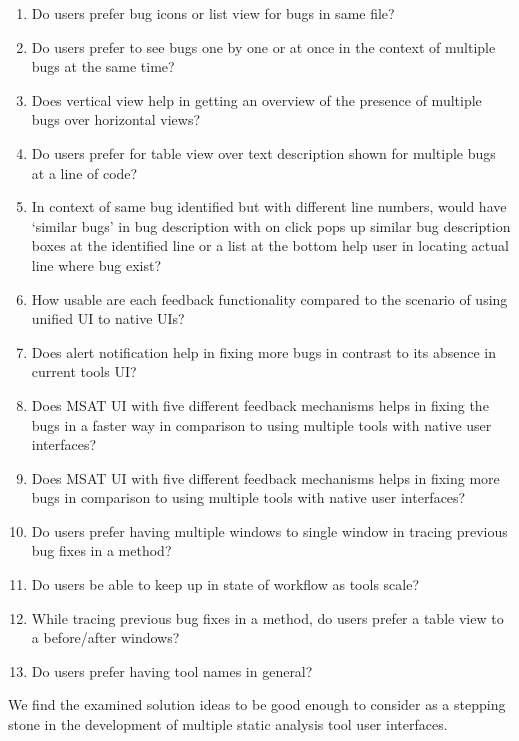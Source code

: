 \begin{enumerate}
	\item Do users prefer bug icons or list view for bugs in same file?
	\item Do users prefer to see bugs one by one or at once in the context of multiple bugs at the same time?
	\item Does vertical view help in getting an overview of the presence of multiple bugs over horizontal views?
	\item Do users prefer for table view over text description shown for multiple bugs at a line of code?
	\item In context of same bug identified but with different line numbers, would have ‘similar bugs’ in bug description with on click pops up similar bug description boxes at the identified line or a list at the bottom help user in locating actual line where bug exist?
	\item How usable are each feedback functionality compared to the scenario of using unified UI to native UIs?
	\item Does alert notification help in fixing more bugs in contrast to its absence in current tools UI?
	\item Does MSAT UI with five different feedback mechanisms helps in fixing the bugs in a faster way in comparison to using multiple tools with native user interfaces?
	\item Does MSAT UI with five different feedback mechanisms helps in fixing more bugs in comparison to using multiple tools with native user interfaces?
	\item Do users prefer having multiple windows to single window in tracing previous bug fixes in a method?
	\item Do users be able to keep up in state of workflow as tools scale?
	\item While tracing previous bug fixes in a method, do users prefer a table view to a before/after windows?
	\item Do users prefer having tool names in general? \\
\end{enumerate}

We find the examined solution ideas to be good enough to consider as a stepping stone in the development of multiple static analysis tool user interfaces. \\ \\

\let\cleardoublepage\clearpage